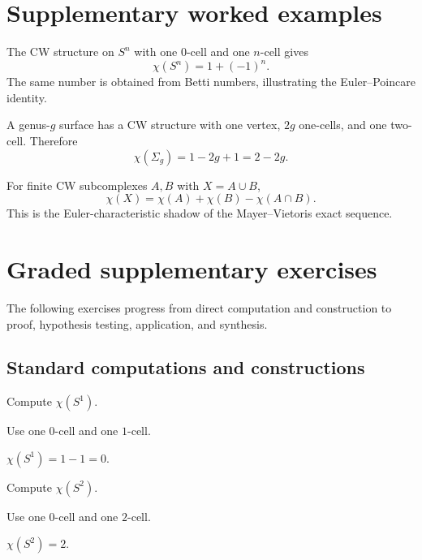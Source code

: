 \section{Supplementary worked examples}
\label{sec:viii21-pedagogy}

\begin{example}\label{ex:viii21-ped-01}
The CW structure on $S^n$ with one $0$-cell and one $n$-cell gives
\[
\chi(S^n)=1+(-1)^n.
\]
The same number is obtained from Betti numbers, illustrating the Euler--Poincare identity.
\end{example}

\begin{example}\label{ex:viii21-ped-02}
A genus-$g$ surface has a CW structure with one vertex, $2g$ one-cells, and one two-cell. Therefore
\[
\chi(\Sigma_g)=1-2g+1=2-2g.
\]
\end{example}

\begin{example}\label{ex:viii21-ped-03}
For finite CW subcomplexes $A,B$ with $X=A\cup B$,
\[
\chi(X)=\chi(A)+\chi(B)-\chi(A\cap B).
\]
This is the Euler-characteristic shadow of the Mayer--Vietoris exact sequence.
\end{example}

\section{Graded supplementary exercises}
The following exercises progress from direct computation and construction to proof, hypothesis testing, application, and synthesis.

\subsection*{Standard computations and constructions}

\begin{exercise}[Circle]\label{exr:viii21-ped-01}
Compute $\chi(S^1)$.
\end{exercise}
\begin{hint}
Use one $0$-cell and one $1$-cell.
\end{hint}
\begin{solution}
$\chi(S^1)=1-1=0$.
\end{solution}

\begin{exercise}\label{exr:viii21-ped-02}
Compute $\chi(S^2)$.
\end{exercise}
\begin{hint}
Use one $0$-cell and one $2$-cell.
\end{hint}
\begin{solution}
$\chi(S^2)=2$.
\end{solution}

